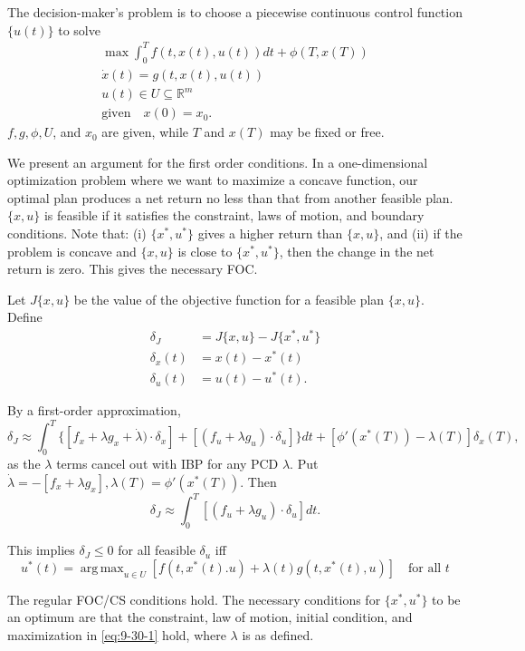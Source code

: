 \documentclass{tufte-handout}
\newcommand*\R{\mathbb{R}}
\DeclareMathOperator*{\argmax}{arg\,max} %
\theoremstyle{definition}
\begin{document}
The decision-maker's problem is to choose a piecewise continuous control function $\{u(t)\}$ to solve
\begin{align*}
	\max \int_{0}^{T} f(t,x(t),u(t))dt + \phi(T, x(T)) \\
	\dot{x}(t) = g(t,x(t), u(t)) \\
	u(t) \in U \subseteq\R^m \\
	\text{given} \quad x(0) = x_0
.\end{align*}
$f,g,\phi, U$, and $x_0$ are given, while $T$ and $x(T)$ may be fixed or free.

We present an argument for the first order conditions. In a one-dimensional optimization problem where we want to maximize a concave function, our optimal plan produces a net return no less than that from another feasible plan. $\{x,u\}$ is feasible if it satisfies the constraint, laws of motion, and boundary conditions. 
Note that: (i) $\{x^*, u^*\}$ gives a higher return than $\{x,u\}$, and (ii) if the problem is concave and $\{x,u\}$ is close to $\{x^*, u^*\}$, then the change in the net return is zero. This gives the necessary FOC.

Let $J \{x,u\}$ be the value of the objective function for a feasible plan $\{x,u\}$. Define
\begin{align*}
	\delta_J &= J \{x,u\} - J \{x^*, u^*\} \\
	\delta_x(t) &= x(t) - x^*(t) \\
	\delta_u(t) &= u(t) - u^*(t)
.\end{align*}

By a first-order approximation, \[
	\delta_J \approx \int_{0}^{T} \{\left[ f_x + \lambda g_x + \dot{\lambda}) \cdot \delta_x \right] + \left[ (f_u + \lambda g_u) \cdot \delta_u \right] \} dt + \left[ \phi'(x^*(T)) - \lambda(T) \right] \delta_x(T) 
,\] as the $\lambda$ terms cancel out with IBP for any PCD $\lambda$. Put $\dot{\lambda} = -\left[ f_x + \lambda g_x \right], \lambda(T) = \phi'(x^*(T))$. Then \[
	\delta_J \approx \int_{0}^{T} \left[ (f_u + \lambda g_u) \cdot \delta_u \right]  dt
.\] 

This implies $\delta_J \le 0$ for all feasible $\delta_u$ iff 
\begin{equation}
	u^*(t) = \argmax_{u \in U} \left[ f(t,x^*(t).u) + \lambda(t) g(t,x^*(t),u) \right] \quad \text{for all } t \label{eq:9-30-1}
\end{equation}

The regular FOC/CS conditions hold. The necessary conditions for $\{x^*, u^*\}$ to be an optimum are that the constraint, law of motion, initial condition, and maximization in \ref{eq:9-30-1} hold, where $\lambda$ is as defined.
\end{document}
